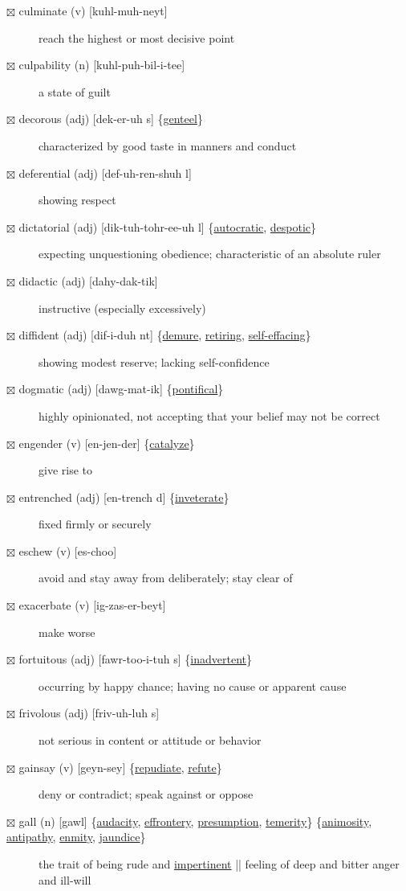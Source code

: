 \documentclass[11pt]{article}
\begin{document}
\begin{description}
\item[{$\boxtimes$ culminate (v) [kuhl-muh-neyt]}] reach the highest or most decisive point
\item[{$\boxtimes$ culpability (n) [kuhl-puh-bil-i-tee]}] a state of guilt
\item[{$\boxtimes$ \label{orge30bfd6}decorous (adj) [dek-er-uh s] \{\hyperref[orgf14b259]{genteel}\}}] characterized by good taste in manners and conduct
\item[{$\boxtimes$ deferential (adj) [def-uh-ren-shuh l]}] showing respect
\item[{$\boxtimes$ \label{orgcf82f48}dictatorial (adj) [dik-tuh-tohr-ee-uh l] \{\hyperref[orgffb70f5]{autocratic}, \hyperref[org81a047e]{despotic}\}}] expecting unquestioning obedience; characteristic of an absolute ruler
\item[{$\boxtimes$ \label{org8fab267}didactic (adj) [dahy-dak-tik]}] instructive (especially excessively)
\item[{$\boxtimes$ \label{org76fbc15}diffident (adj) [dif-i-duh nt] \{\hyperref[orga7b7e07]{demure}, \hyperref[org686afa2]{retiring}, \hyperref[org506513a]{self-effacing}\}}] showing modest reserve; lacking self-confidence
\item[{$\boxtimes$ dogmatic (adj) [dawg-mat-ik] \{\hyperref[org62d97c4]{pontifical}\}}] highly opinionated, not accepting that your belief may not be correct
\item[{$\boxtimes$ engender (v) [en-jen-der] \{\hyperref[org49b5c45]{catalyze}\}}] give rise to
\item[{$\boxtimes$ \label{orgcd381ea}entrenched (adj) [en-trench d] \{\hyperref[org4a1704d]{inveterate}\}}] fixed firmly or securely
\item[{$\boxtimes$ eschew (v) [es-choo]}] avoid and stay away from deliberately; stay clear of
\item[{$\boxtimes$ exacerbate (v) [ig-zas-er-beyt]}] make worse
\item[{$\boxtimes$ \label{org95f167d}fortuitous (adj) [fawr-too-i-tuh s] \{\hyperref[orgf661499]{inadvertent}\}}] occurring by happy chance; having no cause or apparent cause
\item[{$\boxtimes$ \label{orgd30240e}frivolous (adj) [friv-uh-luh s]}] not serious in content or attitude or behavior
\item[{$\boxtimes$ \label{orgc771101}gainsay (v) [geyn-sey] \{\hyperref[org1211120]{repudiate}, \hyperref[org0b4ccdf]{refute}\}}] deny or contradict; speak against or oppose
\item[{$\boxtimes$ \label{orge1299c1}gall (n) [gawl] \{\hyperref[org67e3069]{audacity}, \hyperref[orgfd36353]{effrontery}, \hyperref[org8e41497]{presumption}, \hyperref[org0f0706a]{temerity}\} \{\hyperref[orgcd922a6]{animosity}, \hyperref[org53f5dc2]{antipathy}, \hyperref[org22b3817]{enmity}, \hyperref[orgfb883d9]{jaundice}\}}] the trait of being rude and \hyperref[org66b257e]{impertinent} || feeling of deep and bitter anger and ill-will

\end{description}
\end{document}
